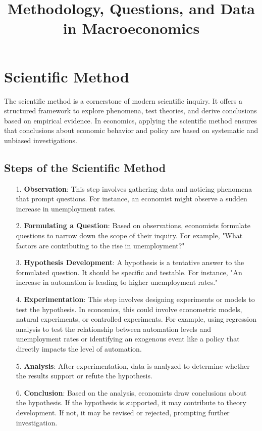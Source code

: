 \documentclass[10pt]{article}
\begin{document}
\title{Methodology, Questions, and Data in Macroeconomics}

\section*{Scientific Method}
The scientific method is a cornerstone of modern scientific inquiry. It offers a structured framework to explore phenomena, test theories, and derive conclusions based on empirical evidence. In economics, applying the scientific method ensures that conclusions about economic behavior and policy are based on systematic and unbiased investigations.

\subsection*{Steps of the Scientific Method}
\begin{enumerate}
  \item[1.] \textbf{Observation}: This step involves gathering data and noticing phenomena that prompt questions. For instance, an economist might observe a sudden increase in unemployment rates.

  \item[2.] \textbf{Formulating a Question}: Based on observations, economists formulate questions to narrow down the scope of their inquiry. For example, "What factors are contributing to the rise in unemployment?"
  
  \item[3.] \textbf{Hypothesis Development}: A hypothesis is a tentative answer to the formulated question. It should be specific and testable. For instance, "An increase in automation is leading to higher unemployment rates."
  
  \item[4.] \textbf{Experimentation}: This step involves designing experiments or models to test the hypothesis. In economics, this could involve econometric models, natural experiments, or controlled experiments. For example, using regression analysis to test the relationship between automation levels and unemployment rates or identifying an exogenous event like a policy that directly impacts the level of automation.
  
  \item[5.] \textbf{Analysis}: After experimentation, data is analyzed to determine whether the results support or refute the hypothesis.
  
  \item[6.] \textbf{Conclusion}: Based on the analysis, economists draw conclusions about the hypothesis. If the hypothesis is supported, it may contribute to theory development. If not, it may be revised or rejected, prompting further investigation.
\end{enumerate}
\end{document}
